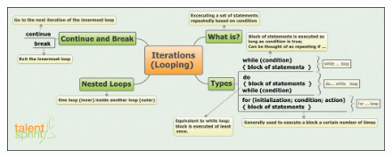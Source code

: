 \documentclass[11pt,a4paper]{article}
\begin{document}
\begin{figure}[H]
 \begin{center}
   \includegraphics[angle=90,height=20cm, width=13cm]{WhileLoops.png}
 \end{center}
 \end{figure}
\end{document}
